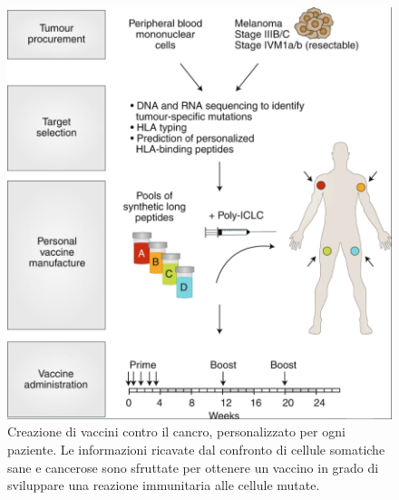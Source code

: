 \documentclass[11pt]{article}
\begin{document}
\begin{figure}[H]
	\centering
	\includegraphics[height=0.2\textheight]{vaccino_cancro}
	\caption{Creazione di vaccini contro il cancro, personalizzato per ogni paziente. Le informazioni ricavate dal confronto di cellule somatiche sane e cancerose sono sfruttate per ottenere un vaccino in grado di sviluppare una reazione immunitaria alle cellule mutate.\cite{scheetz2019engineering}}
	\label{fig:vaccinocancro}
\end{figure}

\newpage



\end{document}
